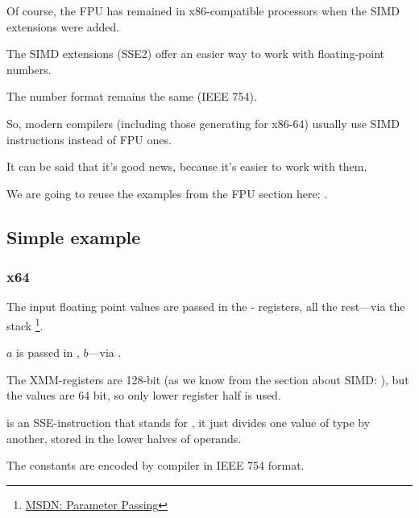 
\label{floating_SIMD}

Of course, the \ac{FPU} has remained in x86-compatible processors when the \ac{SIMD} extensions were added.

The \ac{SIMD} extensions (SSE2) offer an easier way to work with floating-point numbers.

The number format remains the same (IEEE 754).

So, modern compilers (including those generating
for x86-64) usually use \ac{SIMD} instructions instead of FPU ones.

It can be said that it's good news, because it's easier to work with them.

We are going to reuse the examples from the FPU section here: .

\subsection{Simple example}



\subsubsection{x64}



The input floating point values are passed in the - registers,
all the rest---via the stack
\footnote{\href{http://msdn.microsoft.com/en-us/library/zthk2dkh.aspx}{MSDN: Parameter Passing}}.

$a$ is passed in , $b$---via .

The XMM-registers are 128-bit (as we know from the section about \ac{SIMD}: ), 
but the \Tdouble values are 64 bit, so only lower register half is used.

 is an SSE-instruction that stands for 
, 
it just divides
one value of type \Tdouble by another, stored in the lower halves of operands.

The constants are encoded by compiler in IEEE 754 format.

